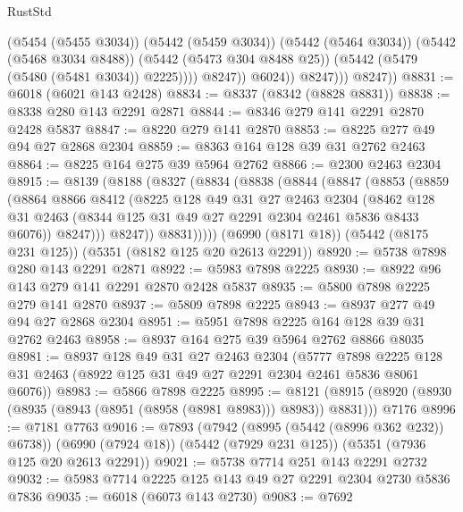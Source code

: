 \begin{lexlean}{RustStd}
\begin{coremodule}
                          (@5454 (@5455 @3034))
                          (@5442 (@5459 @3034))
                          (@5442 (@5464 @3034))
                          (@5442 (@5468 @3034 @8488))
                          (@5442 (@5473 @304 @8488 @25))
                          (@5442 (@5479 (@5480 (@5481 @3034)) @2225))))
                      @8247))
                  @6024))
              @8247)))
        @8247))
@8831 := @6018 (@6021 @143 @2428)
@8834 := @8337 (@8342 (@8828 @8831))
@8838 := @8338 @280 @143 @2291 @2871
@8844 := @8346 @279 @141 @2291 @2870 @2428 @5837
@8847 := @8220 @279 @141 @2870
@8853 := @8225 @277 @49 @94 @27 @2868 @2304
@8859 := @8363 @164 @128 @39 @31 @2762 @2463
@8864 := @8225 @164 @275 @39 @5964 @2762
@8866 := @2300 @2463 @2304
@8915 := @8139
    (@8188
      (@8327
        (@8834
          (@8838
            (@8844
              (@8847
                (@8853
                  (@8859
                    (@8864
                      @8866
                      @8412
                      (@8225
                        @128
                        @49
                        @31
                        @27
                        @2463
                        @2304
                        (@8462
                          @128
                          @31
                          @2463
                          (@8344 @125 @31 @49 @27 @2291 @2304 @2461 @5836 @8433 @6076))
                        @8247)))
                  @8247))
              @8831)))))
    (@6990 (@8171 @18))
    (@5442 (@8175 @231 @125))
    (@5351 (@8182 @125 @20 @2613 @2291))
@8920 := @5738 @7898 @280 @143 @2291 @2871
@8922 := @5983 @7898 @2225
@8930 := @8922 @96 @143 @279 @141 @2291 @2870 @2428 @5837
@8935 := @5800 @7898 @2225 @279 @141 @2870
@8937 := @5809 @7898 @2225
@8943 := @8937 @277 @49 @94 @27 @2868 @2304
@8951 := @5951 @7898 @2225 @164 @128 @39 @31 @2762 @2463
@8958 := @8937 @164 @275 @39 @5964 @2762 @8866 @8035
@8981 := @8937
    @128
    @49
    @31
    @27
    @2463
    @2304
    (@5777 @7898 @2225 @128 @31 @2463 (@8922 @125 @31 @49 @27 @2291 @2304 @2461 @5836 @8061 @6076))
@8983 := @5866 @7898 @2225
@8995 := @8121
    (@8915 (@8920 (@8930 (@8935 (@8943 (@8951 (@8958 (@8981 @8983))) @8983)) @8831)))
    @7176
@8996 := @7181 @7763
@9016 := @7893
    (@7942 (@8995 (@5442 (@8996 @362 @232)) @6738))
    (@6990 (@7924 @18))
    (@5442 (@7929 @231 @125))
    (@5351 (@7936 @125 @20 @2613 @2291))
@9021 := @5738 @7714 @251 @143 @2291 @2732
@9032 := @5983 @7714 @2225 @125 @143 @49 @27 @2291 @2304 @2730 @5836 @7836
@9035 := @6018 (@6073 @143 @2730)
@9083 := @7692

\end{coremodule}
\end{lexlean}
